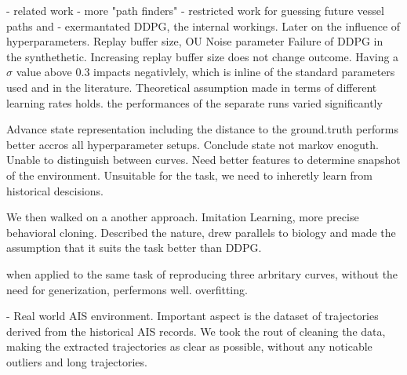 - related work - more "path finders"
- restricted work for guessing future vessel paths \cite{martinsen2018curved} and \cite{edgardo}
- exermantated DDPG, the internal workings. 
Later on the influence of hyperparameters. Replay buffer size, OU Noise parameter
Failure of DDPG in the synthethetic.
Increasing replay buffer size does not change outcome. Having a $\sigma$ value above 0.3 impacts negativlely, which is inline of the standard parameters used and in the literature. Theoretical assumption made in terms of different learning rates holds.
the performances of the separate runs varied significantly

Advance state representation including the distance to the ground.truth performs better accros all hyperparameter setups. Conclude state not markov enoguth. Unable to distinguish between curves. Need better features to determine snapshot of the environment. Unsuitable for the task, we need to inheretly learn from historical descisions. 


We then walked on a another approach. Imitation Learning, more precise behavioral cloning. Described the nature, drew parallels to biology and made the assumption that it suits the task better than DDPG.

when applied to the same task of reproducing three arbritary curves, without the need for generization, perfermons well. overfitting.


- Real world AIS environment. Important aspect is the dataset of trajectories derived from the historical AIS records. We took the rout of cleaning the data, making the extracted trajectories as clear as possible, without any noticable outliers and long trajectories.

